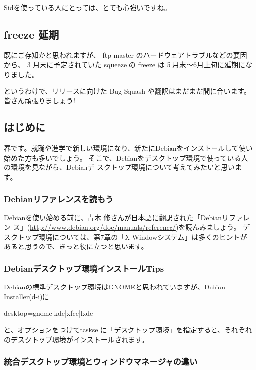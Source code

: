 \documentclass[mingoth,a4paper]{jsarticle}
\begin{document}
Sidを使っている人にとっては、とても心強いですね。


\subsection{freeze 延期}

既にご存知かと思われますが、
ftp master のハードウェアトラブルなどの要因から、
3 月末に予定されていた squeeze の freeze は 5 月末〜6月上旬に延期になりました。

というわけで、リリースに向けた Bug Squash や翻訳はまだまだ間に合います。 皆さん頑張りましょう!




\subsection{はじめに}
春です。就職や進学で新しい環境になり、新たにDebianをインストールして使い
始めた方も多いでしょう。
そこで、Debianをデスクトップ環境で使っている人の環境を見ながら、Debianデ
スクトップ環境について考えてみたいと思います。

\subsubsection{Debianリファレンスを読もう}
Debianを使い始める前に、青木 修さんが日本語に翻訳された「Debianリファレン
ス」(\url{http://www.debian.org/doc/manuals/reference/})を読んみましょう。
デスクトップ環境については、第7章の「X Windowシステム」は多くのヒントがあると思うので、きっと役に立つと思います。

\subsubsection{Debianデスクトップ環境インストールTips}
Debianの標準デスクトップ環境はGNOMEと思われていますが、Debian
Installer(d-i)に

\begin{commandline}
 desktop=gnome|kde|xfce|lxde
\end{commandline}

と、オプションをつけてtaskselに「デスクトップ環境」を指定すると、それぞれ
のデスクトップ環境がインストールされます。

\subsubsection{統合デスクトップ環境とウィンドウマネージャの違い}
\end{document}
